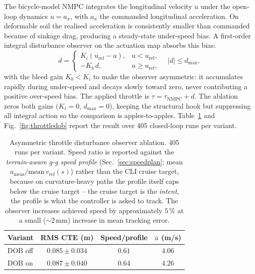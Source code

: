 \documentclass[conference,letterpaper,10pt]{IEEEtran}
\begin{document}
The bicycle-model NMPC integrates the longitudinal velocity $u$
under the open-loop dynamics $\dot u\!=\!a_x$, with $a_x$ the
commanded longitudinal acceleration. On deformable soil the realised
acceleration is consistently smaller than commanded because of
sinkage drag, producing a steady-state under-speed bias. A
first-order integral disturbance observer on the actuation map
absorbs this bias:
\begin{equation}
  \dot d = \begin{cases}
    K_i (u_{\mathrm{ref}} - u), & u < u_{\mathrm{ref}},\\
    -K_b\, d,                   & u \ge u_{\mathrm{ref}},
  \end{cases}
  \quad |d| \le d_{\max},
\end{equation}
with the bleed gain $K_b\!<\!K_i$ to make the observer asymmetric: it
accumulates rapidly during under-speed and decays slowly toward zero,
never contributing a positive over-speed bias. The applied throttle
is $\tau\!=\!\tau_{\mathrm{NMPC}}\!+\!d$. The ablation zeros both
gains ($K_i\!=\!0$, $d_{\max}\!=\!0$), keeping the structural hook
but suppressing all integral action so the comparison is
apples-to-apples. Table~\ref{tab:throttledob} and
Fig.~\ref{fig:throttledob} report the result over 405 closed-loop
runs per variant.

\begin{table}[!t]
  \renewcommand{\arraystretch}{1.15}
  \caption{Asymmetric throttle disturbance observer ablation.
    405 runs per variant. Speed ratio is reported against the
    \emph{terrain-aware g-g speed profile} (Sec.~\ref{sec:speedplan};
    mean $u_\mathrm{meas}/\mathrm{mean}\,v_\mathrm{ref}(s)$) rather than the
    CLI cruise target, because on curvature-heavy paths the profile
    itself caps below the cruise target -- the cruise target is the
    \emph{intent}, the profile is what the controller is
    asked to track. The observer increases achieved speed by approximately
    $5\,\%$ at a small ($\sim$2\,mm) increase in mean tracking error.}
  \label{tab:throttledob}
  \centering
  \setlength{\tabcolsep}{4pt}
  \begin{tabular}{lccc}
    \toprule
    \textbf{Variant} & \textbf{RMS CTE (m)} & \textbf{Speed/profile} & \textbf{$\bar u$ (m/s)}\\
    \midrule
    DOB off & $0.085 \pm 0.034$ & $0.61$ & $4.06$\\
    DOB on  & $0.087 \pm 0.040$ & $\mathbf{0.64}$ & $\mathbf{4.26}$\\
    \bottomrule
  \end{tabular}
\end{table}
\end{document}
